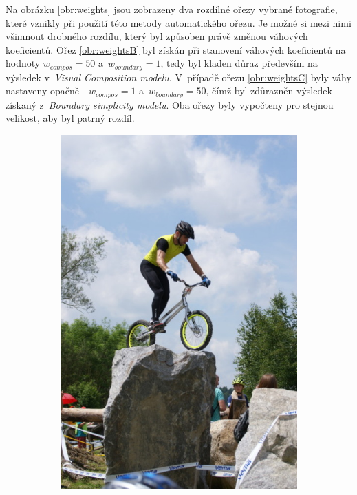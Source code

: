 Na obrázku \ref{obr:weights} jsou zobrazeny dva rozdílné ořezy vybrané fotografie, které vznikly při použití této metody automatického ořezu. Je možné si mezi nimi všimnout drobného rozdílu, který byl způsoben právě změnou váhových koeficientů. Ořez \ref{obr:weightsB} byl získán při stanovení váhových koeficientů na hodnoty $w_{compos}=50$ a~$w_{boundary}=1$, tedy byl kladen důraz především na výsledek v~\emph{Visual Composition modelu}. V~případě ořezu \ref{obr:weightsC} byly váhy nastaveny opačně - $w_{compos}=1$ a~$w_{boundary}=50$, čímž byl zdůrazněn výsledek získaný z~\emph{Boundary simplicity modelu}. Oba ořezy byly vypočteny pro stejnou velikost, aby byl patrný rozdíl.

\begin{figure}[H]
    \centering
    \begin{subfigure}{0.31\textwidth}
      \centering
      \includegraphics[scale=1.0]{obrazky/ORIGivos07.jpg}

\end{subfigure}
\end{figure}

